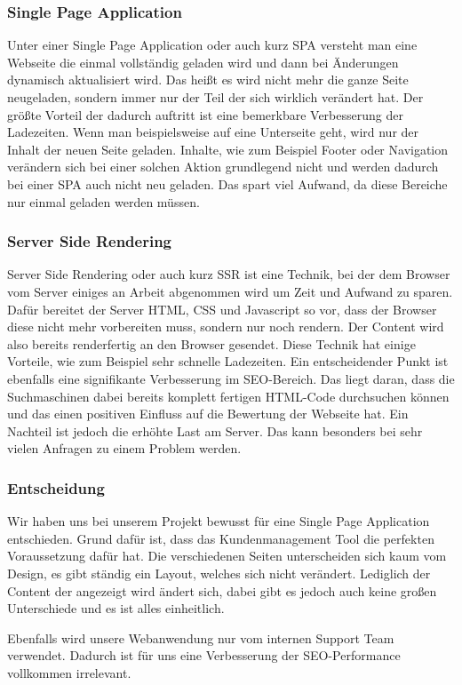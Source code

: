 \subsubsection{Single Page Application}
Unter einer Single Page Application oder auch kurz SPA versteht man eine Webseite die einmal vollständig geladen wird und dann bei Änderungen dynamisch aktualisiert wird. Das heißt es wird nicht mehr die ganze Seite neugeladen, sondern immer nur der Teil der sich wirklich verändert hat. Der größte Vorteil der dadurch auftritt ist eine bemerkbare Verbesserung der Ladezeiten. Wenn man beispielsweise auf eine Unterseite geht, wird nur der Inhalt der neuen Seite geladen. Inhalte, wie zum Beispiel Footer oder Navigation verändern sich bei einer solchen Aktion grundlegend nicht und werden dadurch bei einer SPA auch nicht neu geladen. Das spart viel Aufwand, da diese Bereiche nur einmal geladen werden müssen.
\cite{frontend_spa}

\subsubsection{Server Side Rendering}
Server Side Rendering oder auch kurz SSR ist eine Technik, bei der dem Browser vom Server einiges an Arbeit abgenommen wird um Zeit und Aufwand zu sparen. Dafür bereitet der Server HTML, CSS und Javascript so vor, dass der Browser diese nicht mehr vorbereiten muss, sondern nur noch rendern. Der Content wird also bereits renderfertig an den Browser gesendet.
Diese Technik hat einige Vorteile, wie zum Beispiel sehr schnelle Ladezeiten. Ein entscheidender Punkt ist ebenfalls eine signifikante Verbesserung im SEO-Bereich. Das liegt daran, dass die Suchmaschinen dabei bereits komplett fertigen HTML-Code durchsuchen können und das einen positiven Einfluss auf die Bewertung der Webseite hat. 
Ein Nachteil ist jedoch die erhöhte Last am Server. Das kann besonders bei sehr vielen Anfragen zu einem Problem werden.
\cite{frontend_ssr}

\subsubsection{Entscheidung}
Wir haben uns bei unserem Projekt bewusst für eine Single Page Application entschieden. Grund dafür ist, dass das Kundenmanagement Tool die perfekten Voraussetzung dafür hat. Die verschiedenen Seiten unterscheiden sich kaum vom Design, es gibt ständig ein Layout, welches sich nicht verändert. Lediglich der Content der angezeigt wird ändert sich, dabei gibt es jedoch auch keine großen Unterschiede und es ist alles einheitlich.

Ebenfalls wird unsere Webanwendung nur vom internen Support Team verwendet. Dadurch ist für uns eine Verbesserung der SEO-Performance vollkommen irrelevant.